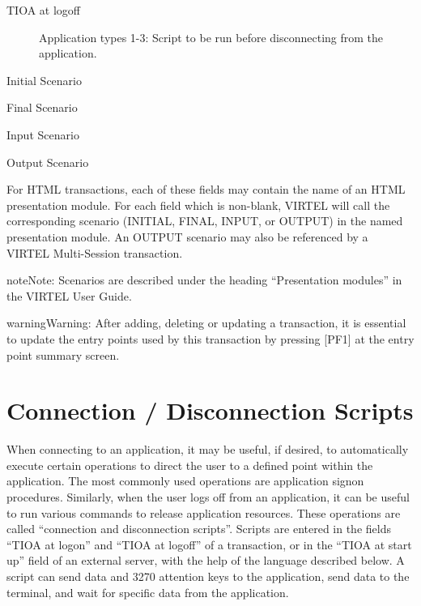 \documentclass[letterpaper,10pt,english]{sphinxmanual}
\begin{document}
\begin{description}
\item[{TIOA at logoff}] \leavevmode
Application types 1-3: Script to be run before disconnecting from the application.

\end{description}

Initial Scenario

Final Scenario

Input Scenario

Output Scenario

For HTML transactions, each of these fields may contain the name of an HTML presentation module. For each field which is non-blank, VIRTEL will call the corresponding scenario (INITIAL, FINAL, INPUT, or OUTPUT) in the named presentation module. An OUTPUT scenario may also be referenced by a VIRTEL Multi-Session transaction.

\begin{sphinxadmonition}{note}{Note:}
Scenarios are described under the heading “Presentation modules” in the VIRTEL User Guide.
\end{sphinxadmonition}

\begin{sphinxadmonition}{warning}{Warning:}
After adding, deleting or updating a transaction, it is essential to update the entry points used by this transaction by pressing {[}PF1{]} at the entry point summary screen.
\end{sphinxadmonition}

\ignorespaces 

\chapter{Connection / Disconnection Scripts}
\label{\detokenize{connectivity_guide:connection-disconnection-scripts}}\label{\detokenize{connectivity_guide:index-116}}
When connecting to an application, it may be useful, if desired, to automatically execute certain operations to direct the user to a defined point within the application. The most commonly used operations are application signon procedures. Similarly, when the user logs off from an application, it can be useful to run various commands to release application resources. These operations are called “connection and disconnection scripts”. Scripts are entered in the fields “TIOA at logon” and “TIOA at logoff” of a transaction, or in the “TIOA at start up” field of an external server, with the help of the language described below. A script can send data and 3270 attention keys to the application, send data to the terminal, and wait for specific data from the application.
\end{document}
